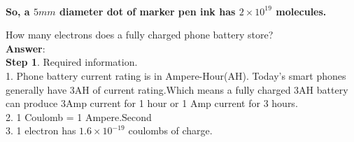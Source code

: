 \documentclass[11pt]{exam}
\begin{document}
\begin{questions}
 \\  

\textbf{So, a $5mm$ diameter dot of marker pen ink has $2\times10^{19}$ molecules.}  \\
                       
 
 
\question
\label{Q8:Phone battery}

How many electrons does a fully charged phone battery store? \\
\textbf{Answer}: \\
\textbf{Step 1}. Required information. \\

1. Phone battery current rating is in Ampere-Hour(AH). Today's smart phones generally have 3AH of current rating.Which means a fully charged 3AH battery can produce 3Amp current for 1 hour or 1 Amp current for 3 hours. \\

2. 1 Coulomb = 1 Ampere.Second \\
              
3. 1 electron has $1.6 \times 10^{-19}$ coulombs of charge.   
              

\end{questions}
\end{document}
